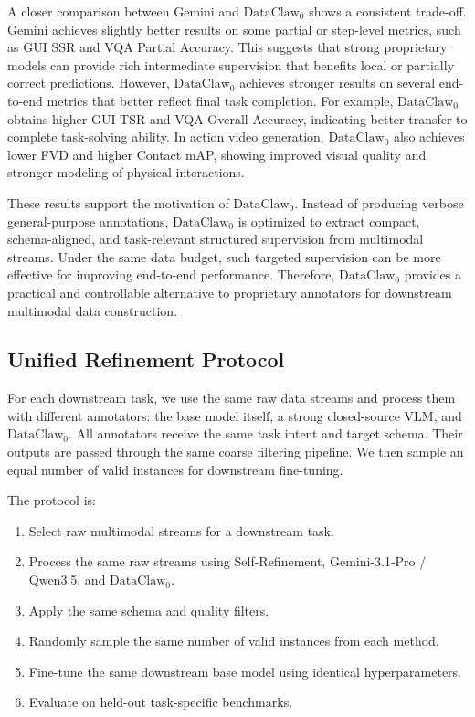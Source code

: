 \documentclass{llmxive}
\begin{document}
A closer comparison between Gemini and $\text{DataClaw}_0$ shows a consistent trade-off. Gemini achieves slightly better results on some partial or step-level metrics, such as GUI SSR and VQA Partial Accuracy. This suggests that strong proprietary models can provide rich intermediate supervision that benefits local or partially correct predictions. However, $\text{DataClaw}_0$ achieves stronger results on several end-to-end metrics that better reflect final task completion. For example, $\text{DataClaw}_0$ obtains higher GUI TSR and VQA Overall Accuracy, indicating better transfer to complete task-solving ability. In action video generation, $\text{DataClaw}_0$ also achieves lower FVD and higher Contact mAP, showing improved visual quality and stronger modeling of physical interactions.

These results support the motivation of $\text{DataClaw}_0$. Instead of producing verbose general-purpose annotations, $\text{DataClaw}_0$ is optimized to extract compact, schema-aligned, and task-relevant structured supervision from multimodal streams. Under the same data budget, such targeted supervision can be more effective for improving end-to-end performance. Therefore, $\text{DataClaw}_0$ provides a practical and controllable alternative to proprietary annotators for downstream multimodal data construction.

\subsection{Unified Refinement Protocol}
\label{app:unified_downstream_protocol}

For each downstream task, we use the same raw data streams and process them with different annotators: the base model itself, a strong closed-source VLM, and $\text{DataClaw}_0$. All annotators receive the same task intent and target schema. Their outputs are passed through the same coarse filtering pipeline. We then sample an equal number of valid instances for downstream fine-tuning.

The protocol is:

\begin{enumerate}[leftmargin=*]
    \item Select raw multimodal streams for a downstream task.
    \item Process the same raw streams using Self-Refinement, Gemini-3.1-Pro / Qwen3.5, and $\text{DataClaw}_0$.
    \item Apply the same schema and quality filters.
    \item Randomly sample the same number of valid instances from each method.
    \item Fine-tune the same downstream base model using identical hyperparameters.
    \item Evaluate on held-out task-specific benchmarks.
\end{enumerate}
\end{document}
